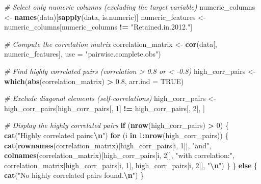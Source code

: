 \documentclass[
]{article}
\newenvironment{Shaded}{\begin{snugshade}}{\end{snugshade}}
\newcommand{\AttributeTok}[1]{\textcolor[rgb]{0.13,0.29,0.53}{#1}}
\newcommand{\CommentTok}[1]{\textcolor[rgb]{0.56,0.35,0.01}{\textit{#1}}}
\newcommand{\ConstantTok}[1]{\textcolor[rgb]{0.56,0.35,0.01}{#1}}
\newcommand{\ControlFlowTok}[1]{\textcolor[rgb]{0.13,0.29,0.53}{\textbf{#1}}}
\newcommand{\DecValTok}[1]{\textcolor[rgb]{0.00,0.00,0.81}{#1}}
\newcommand{\FloatTok}[1]{\textcolor[rgb]{0.00,0.00,0.81}{#1}}
\newcommand{\FunctionTok}[1]{\textcolor[rgb]{0.13,0.29,0.53}{\textbf{#1}}}
\newcommand{\NormalTok}[1]{#1}
\newcommand{\OtherTok}[1]{\textcolor[rgb]{0.56,0.35,0.01}{#1}}
\newcommand{\SpecialCharTok}[1]{\textcolor[rgb]{0.81,0.36,0.00}{\textbf{#1}}}
\newcommand{\StringTok}[1]{\textcolor[rgb]{0.31,0.60,0.02}{#1}}
\begin{document}
\begin{Shaded}
\begin{Highlighting}[]
\CommentTok{\# Select only numeric columns (excluding the target variable)}
\NormalTok{numeric\_columns }\OtherTok{\textless{}{-}} \FunctionTok{names}\NormalTok{(data)[}\FunctionTok{sapply}\NormalTok{(data, is.numeric)]}
\NormalTok{numeric\_features }\OtherTok{\textless{}{-}}\NormalTok{ numeric\_columns[numeric\_columns }\SpecialCharTok{!=} \StringTok{"Retained.in.2012."}\NormalTok{]}

\CommentTok{\# Compute the correlation matrix}
\NormalTok{correlation\_matrix }\OtherTok{\textless{}{-}} \FunctionTok{cor}\NormalTok{(data[, numeric\_features], }\AttributeTok{use =} \StringTok{"pairwise.complete.obs"}\NormalTok{)}

\CommentTok{\# Find highly correlated pairs (correlation \textgreater{} 0.8 or \textless{} {-}0.8)}
\NormalTok{high\_corr\_pairs }\OtherTok{\textless{}{-}} \FunctionTok{which}\NormalTok{(}\FunctionTok{abs}\NormalTok{(correlation\_matrix) }\SpecialCharTok{\textgreater{}} \FloatTok{0.8}\NormalTok{, }\AttributeTok{arr.ind =} \ConstantTok{TRUE}\NormalTok{)}

\CommentTok{\# Exclude diagonal elements (self{-}correlations)}
\NormalTok{high\_corr\_pairs }\OtherTok{\textless{}{-}}\NormalTok{ high\_corr\_pairs[high\_corr\_pairs[, }\DecValTok{1}\NormalTok{] }\SpecialCharTok{!=}\NormalTok{ high\_corr\_pairs[, }\DecValTok{2}\NormalTok{], ]}

\CommentTok{\# Display the highly correlated pairs}
\ControlFlowTok{if}\NormalTok{ (}\FunctionTok{nrow}\NormalTok{(high\_corr\_pairs) }\SpecialCharTok{\textgreater{}} \DecValTok{0}\NormalTok{) \{}
  \FunctionTok{cat}\NormalTok{(}\StringTok{"Highly correlated pairs:}\SpecialCharTok{\textbackslash{}n}\StringTok{"}\NormalTok{)}
  \ControlFlowTok{for}\NormalTok{ (i }\ControlFlowTok{in} \DecValTok{1}\SpecialCharTok{:}\FunctionTok{nrow}\NormalTok{(high\_corr\_pairs)) \{}
    \FunctionTok{cat}\NormalTok{(}\FunctionTok{rownames}\NormalTok{(correlation\_matrix)[high\_corr\_pairs[i, }\DecValTok{1}\NormalTok{]], }
        \StringTok{"and"}\NormalTok{, }
        \FunctionTok{colnames}\NormalTok{(correlation\_matrix)[high\_corr\_pairs[i, }\DecValTok{2}\NormalTok{]], }
        \StringTok{"with correlation:"}\NormalTok{, }
\NormalTok{        correlation\_matrix[high\_corr\_pairs[i, }\DecValTok{1}\NormalTok{], high\_corr\_pairs[i, }\DecValTok{2}\NormalTok{]], }
        \StringTok{"}\SpecialCharTok{\textbackslash{}n}\StringTok{"}\NormalTok{)}
\NormalTok{  \}}
\NormalTok{\} }\ControlFlowTok{else}\NormalTok{ \{}
  \FunctionTok{cat}\NormalTok{(}\StringTok{"No highly correlated pairs found.}\SpecialCharTok{\textbackslash{}n}\StringTok{"}\NormalTok{)}
\NormalTok{\}}
\end{Highlighting}
\end{Shaded}
\end{document}
